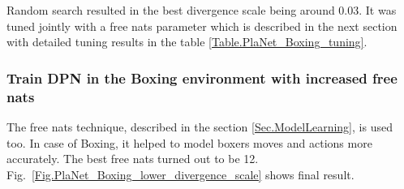 Random search resulted in the best divergence scale being around 0.03. It was tuned jointly with a free nats parameter which is described in the next section with detailed tuning results in the table \ref{Table.PlaNet_Boxing_tuning}.

\subsubsection{Train DPN in the Boxing environment with increased free nats}

The free nats technique, described in the section \ref{Sec.ModelLearning}, is used too. In case of Boxing, it helped to model boxers moves and actions more accurately. The best free nats turned out to be 12. Fig.~\ref{Fig.PlaNet_Boxing_lower_divergence_scale} shows final result.

